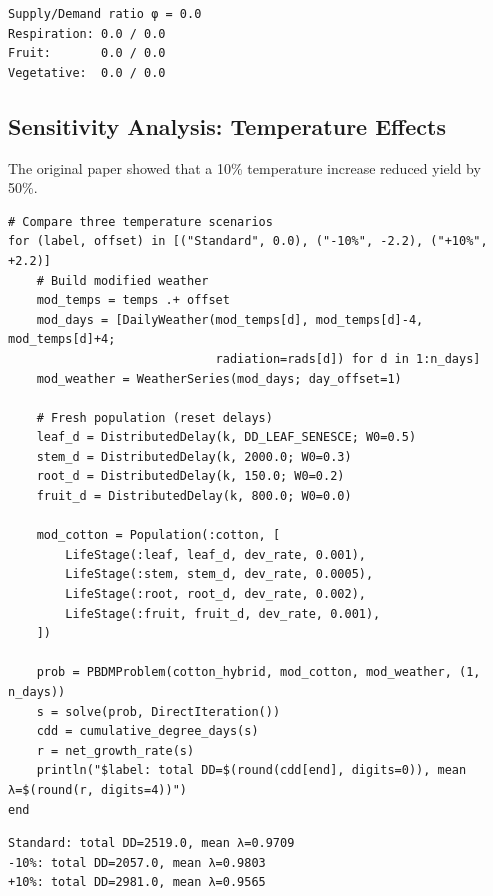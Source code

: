 \begin{verbatim}
Supply/Demand ratio φ = 0.0
Respiration: 0.0 / 0.0
Fruit:       0.0 / 0.0
Vegetative:  0.0 / 0.0
\end{verbatim}



\subsection{Sensitivity Analysis: Temperature Effects}



\label{14021270455136263025}{}


The original paper showed that a 10\% temperature increase reduced yield by 50\%.




\begin{verbatim}
# Compare three temperature scenarios
for (label, offset) in [("Standard", 0.0), ("-10%", -2.2), ("+10%", +2.2)]
    # Build modified weather
    mod_temps = temps .+ offset
    mod_days = [DailyWeather(mod_temps[d], mod_temps[d]-4, mod_temps[d]+4;
                             radiation=rads[d]) for d in 1:n_days]
    mod_weather = WeatherSeries(mod_days; day_offset=1)

    # Fresh population (reset delays)
    leaf_d = DistributedDelay(k, DD_LEAF_SENESCE; W0=0.5)
    stem_d = DistributedDelay(k, 2000.0; W0=0.3)
    root_d = DistributedDelay(k, 150.0; W0=0.2)
    fruit_d = DistributedDelay(k, 800.0; W0=0.0)

    mod_cotton = Population(:cotton, [
        LifeStage(:leaf, leaf_d, dev_rate, 0.001),
        LifeStage(:stem, stem_d, dev_rate, 0.0005),
        LifeStage(:root, root_d, dev_rate, 0.002),
        LifeStage(:fruit, fruit_d, dev_rate, 0.001),
    ])

    prob = PBDMProblem(cotton_hybrid, mod_cotton, mod_weather, (1, n_days))
    s = solve(prob, DirectIteration())
    cdd = cumulative_degree_days(s)
    r = net_growth_rate(s)
    println("$label: total DD=$(round(cdd[end], digits=0)), mean λ=$(round(r, digits=4))")
end
\end{verbatim}




\begin{verbatim}
Standard: total DD=2519.0, mean λ=0.9709
-10%: total DD=2057.0, mean λ=0.9803
+10%: total DD=2981.0, mean λ=0.9565
\end{verbatim}



